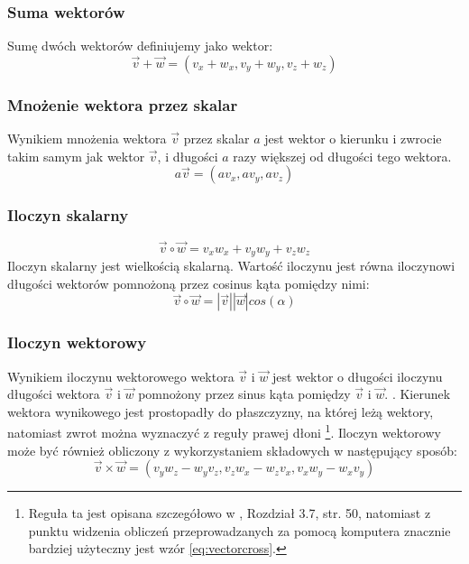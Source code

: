 \subsubsection{Suma wektorów}
Sumę dwóch wektorów definiujemy jako wektor:
\begin{equation}
\vec{v}+\vec{w} = (v_x+w_x, v_y+w_y, v_z+w_z)
\end{equation}

\subsubsection{Mnożenie wektora przez skalar}
Wynikiem mnożenia wektora $\vec{v}$ przez skalar $a$ jest wektor o kierunku i zwrocie takim samym jak wektor $\vec{v}$, i długości $a$ razy większej od długości tego wektora.
\begin{equation}
a \vec{v} = (a v_x, a v_y, a v_z)
\end{equation}

\subsubsection{Iloczyn skalarny}
\begin{equation}
\vec{v} \circ \vec{w} = v_x w_x + v_y w_y + v_z w_z
\end{equation}
Iloczyn skalarny jest wielkością skalarną. Wartość iloczynu jest równa iloczynowi długości wektorów pomnożoną przez cosinus kąta pomiędzy nimi:
\begin{equation}
\vec{v} \circ \vec{w} = |\vec{v}| |\vec{w}| cos(\alpha)
\end{equation}

\subsubsection{Iloczyn wektorowy} 
Wynikiem iloczynu wektorowego wektora $\vec{v}$ i $\vec{w}$ jest wektor o długości iloczynu długości wektora  $\vec{v}$ i  $\vec{w}$ pomnożony przez sinus kąta pomiędzy  $\vec{v}$ i  $\vec{w}$. \cite{bib:resnick1}. Kierunek wektora wynikowego jest prostopadły do płaszczyzny, na której leżą wektory, natomiast zwrot można wyznaczyć z reguły prawej dłoni \footnote{Reguła ta jest opisana szczegółowo w \cite{bib:resnick1}, Rozdział 3.7, str. 50, natomiast z punktu widzenia obliczeń przeprowadzanych za pomocą komputera znacznie bardziej użyteczny jest wzór \ref{eq:vectorcross}.}. 
Iloczyn wektorowy może być również obliczony z wykorzystaniem składowych w następujący sposób:
\begin{equation}
\vec{v} \times \vec{w} = (v_y w_z - w_y v_z, v_z w_x - w_z v_x, v_x w_y-w_x v_y)
\label{eq:vectorcross}
\end{equation}

